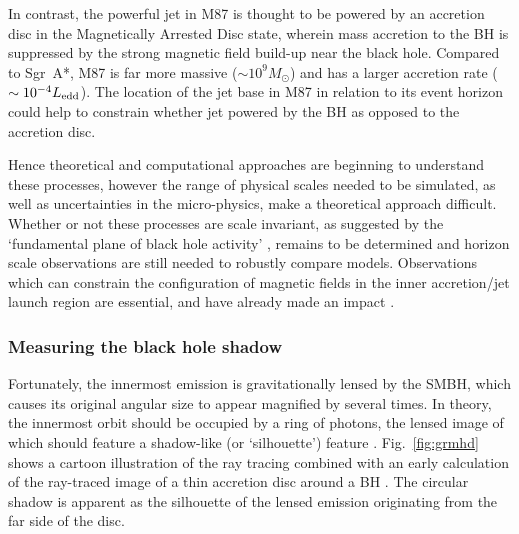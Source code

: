In contrast, the powerful jet in M87 is thought to be powered by an accretion disc in the Magnetically Arrested Disc \citep[(MAD),][]{Narayan_2003} state, wherein mass accretion to the BH is suppressed by the strong magnetic field build-up near the black hole. Compared to Sgr~A*, M87 is far more massive ($\sim 10^9 M_\odot$) and has a larger accretion rate ($\sim 10^{-4} L_{\rm edd}$). The location of the jet base in M87 in relation to its event horizon could help to constrain whether jet powered by the BH as opposed to the accretion disc.


Hence theoretical and computational approaches are beginning to understand these processes, however the range of physical scales needed to be simulated, as well as uncertainties in the micro-physics, make a theoretical approach difficult. Whether or not these processes are scale invariant, as suggested by the `fundamental plane of black hole activity' \citep{Merloni_2003}, remains to be determined and horizon scale observations are still needed to robustly compare models. Observations which can constrain the configuration of magnetic fields in the inner accretion/jet launch region are essential, and have already made an impact \citep{Johnson_2015b}.

\subsubsection{Measuring the black hole shadow}

Fortunately, the innermost emission is gravitationally lensed by the SMBH, which causes its original angular size to appear magnified by several times. In theory, the innermost orbit should be occupied by a ring of photons, the lensed image of which should feature a shadow-like (or `silhouette') feature \citep{Bardeen_1973,Luminet_1979, Falcke_2000,Takahashi_2004, Johannsen_2010}. Fig.~\ref{fig:grmhd} shows a cartoon illustration of the ray tracing combined with an early calculation of the ray-traced image of a thin accretion disc around a BH \citep{Luminet_1979}. The circular shadow is apparent as the silhouette of the lensed emission originating from the far side of the disc. 



